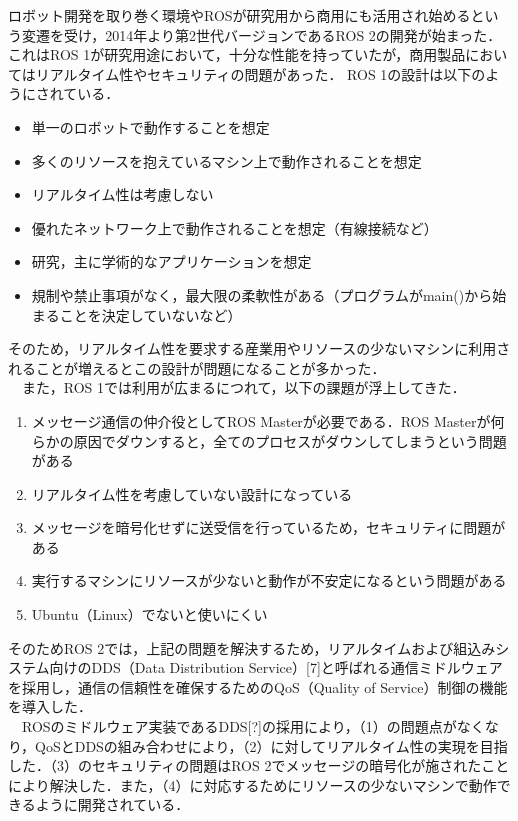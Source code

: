 ロボット開発を取り巻く環境やROSが研究用から商用にも活用され始めるという変遷を受け，2014年より第2世代バージョンであるROS 2の開発が始まった．
これはROS 1が研究用途において，十分な性能を持っていたが，商用製品においてはリアルタイム性やセキュリティの問題があった．
ROS 1の設計は以下のようにされている．
    \begin{itemize}
        \item 単一のロボットで動作することを想定
        \item 多くのリソースを抱えているマシン上で動作されることを想定
        \item リアルタイム性は考慮しない
        \item 優れたネットワーク上で動作されることを想定（有線接続など）
        \item 研究，主に学術的なアプリケーションを想定
        \item 規制や禁止事項がなく，最大限の柔軟性がある（プログラムがmain()から始まることを決定していないなど）
    \end{itemize}
そのため，リアルタイム性を要求する産業用やリソースの少ないマシンに利用されることが増えるとこの設計が問題になることが多かった．
\\　また，ROS 1では利用が広まるにつれて，以下の課題が浮上してきた．
   \begin{enumerate}
       \item メッセージ通信の仲介役としてROS Masterが必要である．ROS Masterが何らかの原因でダウンすると，全てのプロセスがダウンしてしまうという問題がある
       \item リアルタイム性を考慮していない設計になっている
       \item メッセージを暗号化せずに送受信を行っているため，セキュリティに問題がある
       \item 実行するマシンにリソースが少ないと動作が不安定になるという問題がある
       \item Ubuntu（Linux）でないと使いにくい
   \end{enumerate}
そのためROS 2では，上記の問題を解決するため，リアルタイムおよび組込みシステム向けのDDS（Data Distribution Service）[7]と呼ばれる通信ミドルウェアを採用し，通信の信頼性を確保するためのQoS（Quality of Service）制御の機能を導入した．
\\　ROSのミドルウェア実装であるDDS[?]の採用により，（1）の問題点がなくなり，QoSとDDSの組み合わせにより，（2）に対してリアルタイム性の実現を目指した．（3）のセキュリティの問題はROS 2でメッセージの暗号化が施されたことにより解決した．また，（4）に対応するためにリソースの少ないマシンで動作できるように開発されている．

